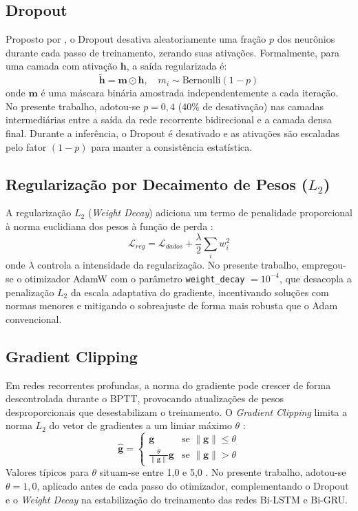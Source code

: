 \subsection{Dropout}
Proposto por \cite{srivastava2014dropout}, o Dropout desativa aleatoriamente uma fração $p$ dos neurônios durante cada passo de treinamento, zerando suas ativações. Formalmente, para uma camada com ativação $\mathbf{h}$, a saída regularizada é:
\begin{equation}
    \tilde{\mathbf{h}} = \mathbf{m} \odot \mathbf{h}, \quad m_i \sim \text{Bernoulli}(1 - p)
\end{equation}
onde $\mathbf{m}$ é uma máscara binária amostrada independentemente a cada iteração. No presente trabalho, adotou-se $p = 0{,}4$ (40\% de desativação) nas camadas intermediárias entre a saída da rede recorrente bidirecional e a camada densa final. Durante a inferência, o Dropout é desativado e as ativações são escaladas pelo fator $(1 - p)$ para manter a consistência estatística.

\subsection{Regularização por Decaimento de Pesos \texorpdfstring{($L_2$)}{(L2)}}
A regularização $L_2$ (\textit{Weight Decay}) adiciona um termo de penalidade proporcional à norma euclidiana dos pesos à função de perda \cite{goodfellow2016deep}:
\begin{equation}
    \mathcal{L}_{reg} = \mathcal{L}_{dados} + \frac{\lambda}{2} \sum_{i} w_i^2
\end{equation}
onde $\lambda$ controla a intensidade da regularização. No presente trabalho, empregou-se o otimizador AdamW \cite{loshchilov2019decoupled} com o parâmetro \texttt{weight\_decay} $= 10^{-4}$, que desacopla a penalização $L_2$ da escala adaptativa do gradiente, incentivando soluções com normas menores e mitigando o sobreajuste de forma mais robusta que o Adam convencional.

\subsection{Gradient Clipping}
Em redes recorrentes profundas, a norma do gradiente pode crescer de forma descontrolada durante o BPTT, provocando atualizações de pesos desproporcionais que desestabilizam o treinamento. O \textit{Gradient Clipping} limita a norma $L_2$ do vetor de gradientes a um limiar máximo $\theta$ \cite{pascanu2013difficulty}:
\begin{equation}
    \hat{\mathbf{g}} = \begin{cases} \mathbf{g} & \text{se } \|\mathbf{g}\| \leq \theta \\ \frac{\theta}{\|\mathbf{g}\|} \mathbf{g} & \text{se } \|\mathbf{g}\| > \theta \end{cases}
\end{equation}
Valores típicos para $\theta$ situam-se entre 1,0 e 5,0 \cite{pascanu2013difficulty}. No presente trabalho, adotou-se $\theta = 1{,}0$, aplicado antes de cada passo do otimizador, complementando o Dropout e o \textit{Weight Decay} na estabilização do treinamento das redes Bi-LSTM e Bi-GRU.


